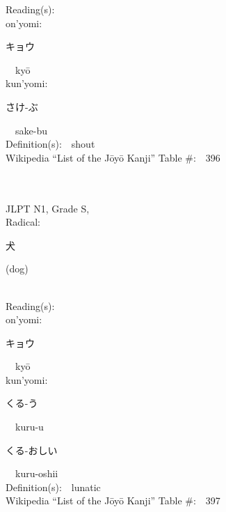 \begin{multicols}{2}
Reading(s):\ \ \\
{\hspace*{1em}}on'yomi:\ \ \\
{\hspace*{2em}}{\begin{CJK}{UTF8}{min} キョウ \end{CJK}}\ \ ky\=o\ \ \\
{\hspace*{1em}}kun'yomi:\ \ \\
{\hspace*{2em}}{\begin{CJK}{UTF8}{min} さけ-ぶ \end{CJK}}\ \ sake-bu\ \ \\
Definition(s):\ \ shout \\
Wikipedia ``List of the J\=oy\=o Kanji'' Table \#:\ \ 396 \\
\ \ \\
{\fontsize{34pt}{40pt}  }\ \ \\
{JLPT N1, Grade S, \\Radical:\ \ {\begin{CJK}{UTF8}{min} 犬 \end{CJK}} (dog) } \\
Reading(s):\ \ \\
{\hspace*{1em}}on'yomi:\ \ \\
{\hspace*{2em}}{\begin{CJK}{UTF8}{min} キョウ \end{CJK}}\ \ ky\=o\ \ \\
{\hspace*{1em}}kun'yomi:\ \ \\
{\hspace*{2em}}{\begin{CJK}{UTF8}{min} くる-う \end{CJK}}\ \ kuru-u\ \ \\
{\hspace*{2em}}{\begin{CJK}{UTF8}{min} くる-おしい \end{CJK}}\ \ kuru-oshii\ \ \\
Definition(s):\ \ lunatic \\
Wikipedia ``List of the J\=oy\=o Kanji'' Table \#:\ \ 397 \\
\ \ \\

\end{multicols}
